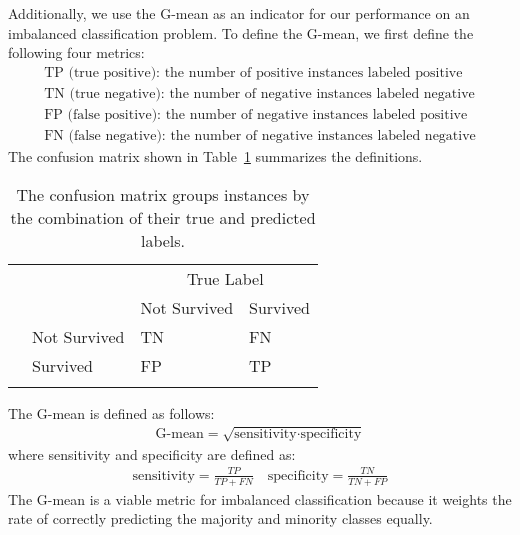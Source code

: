 \documentclass[review]{elsarticle}
\newcommand*\rot{\rotatebox{90}}
\begin{document}
Additionally, we use the G-mean as an indicator for our performance on an imbalanced classification problem. To define the G-mean, we first define the following four metrics:
\begin{align*}
\text{TP (true positive): the number of positive instances labeled positive}\\
\text{TN (true negative): the number of negative instances labeled negative}\\
\text{FP (false positive): the number of negative instances labeled positive}\\
\text{FN (false negative): the number of negative instances labeled negative}
\end{align*} 
The confusion matrix shown in Table~\ref{confusion-matrix} summarizes the definitions.
\begin{table}[H]
	
	\caption{The confusion matrix groups instances by the combination of their true and predicted labels.}
	\centering
	\begin{tabular}{llll}
		&                                   & \multicolumn{2}{c}{True Label}                     \\ 
		\cline{3-4}
		&                                   & Not Survived            & Survived                 \\ 
		\cline{3-4}
		\multirow{2}{*}{\rot{Predicted}} & \multicolumn{1}{|l|}{Not Survived} & \multicolumn{1}{l|}{TN} & \multicolumn{1}{l|}{FN}  \\ 
		\cline{3-4}
		\multicolumn{1}{l}{}                & \multicolumn{1}{|l|}{Survived}     & \multicolumn{1}{l|}{FP} & \multicolumn{1}{l|}{TP}  \\ 
		\cline{3-4}
		&                                   &                         &                         
	\end{tabular}
	
	\label{confusion-matrix}
\end{table}
\noindent The G-mean is defined as follows:
\begin{align*}
	\text{G-mean} = \sqrt{\text{sensitivity}\cdot\text{specificity}}
\end{align*}
where sensitivity and specificity are defined as:
\begin{align*}
\text{sensitivity} = \frac{TP}{TP + FN} \quad\text{specificity} = \frac{TN}{TN + FP}
\end{align*}
 The G-mean is a viable metric for imbalanced classification because it weights the rate of correctly predicting the majority and minority classes equally.
\end{document}
